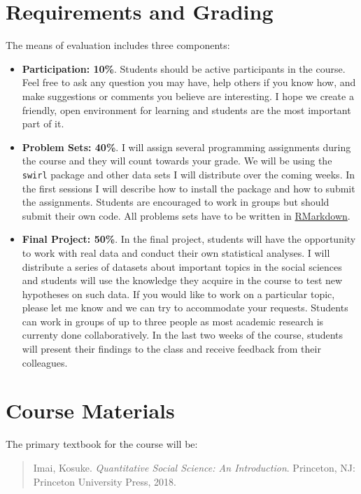 \documentclass[a4paper,12pt]{article}
\begin{document}
\section{Requirements and Grading}
\label{sec:requirements}

The means of evaluation includes three components:

\begin{itemize}
	\item \textbf{Participation: 10\%}. Students should be active participants in the course. Feel free to ask any question you may have, help others if you know how, and make suggestions or comments you believe are interesting. I hope we create a friendly, open environment for learning and students are the most important part of it.
	\item \textbf{Problem Sets: 40\%}. I will assign several programming assignments during the course and they will count towards your grade. We will be using the \texttt{swirl} package and other data sets I will distribute over the coming weeks. In the first sessions I will describe how to install the package and how to submit the assignments. Students are encouraged to work in groups but should submit their own code. All problems sets have to be written in \href{https://rmarkdown.rstudio.com/}{RMarkdown}. 
	\item \textbf{Final Project: 50\%}. In the final project, students will have the opportunity to work with real data and conduct their own statistical analyses. I will distribute a series of datasets about important topics in the social sciences and students will use the knowledge they acquire in the course to test new hypotheses on such data. If you would like to work on a particular topic, please let me know and we can try to accommodate your requests. Students can work in groups of up to three people as most academic research is currenty done collaboratively. In the last two weeks of the course, students will present their findings to the class and receive feedback from their colleagues. 
\end{itemize}


\section{Course Materials}%
\label{sec:course_materials}

The primary textbook for the course will be: 

\begin{quote}
Imai, Kosuke. \textit{Quantitative Social Science: An Introduction}. Princeton, NJ: Princeton University Press, 2018.
\end{quote}
\end{document}
